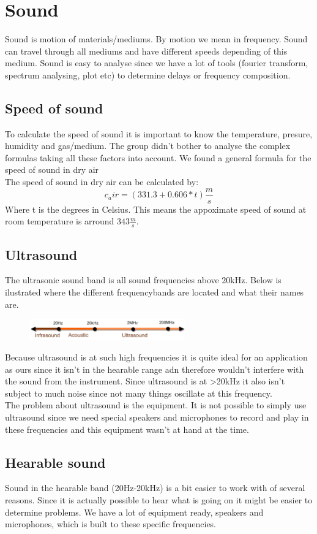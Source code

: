 \section{Sound}
Sound is motion of materials/mediums. By motion we mean in frequency. Sound can travel through all mediums and have different speeds depending of this medium. Sound is easy to analyse since we have a lot of tools (fourier transform, spectrum analysing, plot etc) to determine delays or frequency composition.

\subsection{Speed of sound}
To calculate the speed of sound it is important to know the temperature, presure, humidity and gas/medium. The group didn't bother to analyse the complex formulas taking all these factors into account. We found a general formula for the speed of sound in dry air\\
The speed of sound in dry air can be calculated by:
\begin{equation}
c_air=(331.3+0.606*t)\frac{m}{s}
\end{equation}
Where t is the degrees in Celsius. This means the appoximate speed of sound at room temperature is arround $343\frac{m}{s}$.\\
\subsection{Ultrasound}
The ultrasonic sound band is all sound frequencies above 20kHz. Below is ilustrated where the different frequencybands are located and what their names are.
\begin{figure}[H]
\centering
\includegraphics[width=0.6\textwidth]{billeder/frequencybands.png}
\end{figure}
Because ultrasound is at such high frequencies it is quite ideal for an application as ours since it isn't in the hearable range adn therefore wouldn't interfere with the sound from the instrument. Since ultrasound is at >20kHz it also isn't subject to much noise since not many things oscillate at this frequency.\\
The problem about ultrasound is the equipment. It is not possible to simply use ultrasound since we need special speakers and microphones to record and play in these frequencies and this equipment wasn't at hand at the time.
\subsection{Hearable sound}
Sound in the hearable band (20Hz-20kHz) is a bit easier to work with of several reasons. Since it is actually possible to hear what is going on it might be easier to determine problems. We have a lot of equipment ready, speakers and microphones, which is built to these specific frequencies.